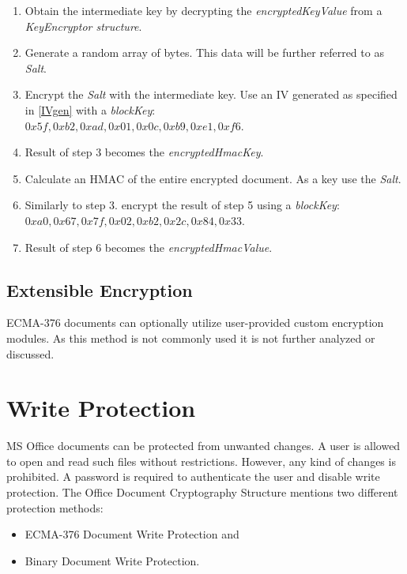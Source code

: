 \documentclass[11pt,oneside]{fithesis2}
\begin{document}
\begin{enumerate}
\setlength\itemsep{0.1em}
	\item{Obtain the intermediate key by decrypting the \textit{encryptedKeyValue} from a \textit{KeyEncryptor structure}.}
	\item{Generate a random array of bytes. This data will be further referred to as \textit{Salt}.}
	\item{Encrypt the \textit{Salt} with the intermediate key. Use an IV generated as specified in \ref{IVgen} with a \textit{blockKey}: \\ $0x5f, 0xb2, 0xad, 0x01, 0x0c, 0xb9, 0xe1, 0xf6$.}
	\item{Result of step 3 becomes the \textit{encryptedHmacKey}.}
	\item{Calculate an HMAC of the entire encrypted document. As a key use the \textit{Salt}.}
	\item{Similarly to step 3. encrypt the result of step 5 using a \textit{blockKey}: $0xa0, 0x67, 0x7f, 0x02, 0xb2, 0x2c, 0x84, 0x33$.}
	\item{Result of step 6 becomes the \textit{encryptedHmacValue}.}
\end{enumerate}

\subsection{Extensible Encryption} 

ECMA-376 documents can optionally utilize user-provided custom encryption modules. As this method is not commonly used it is not further analyzed or discussed.  

\section{Write Protection}

MS Office documents can be protected from unwanted changes. A user is allowed to open and read such files without restrictions. However, any kind of changes is prohibited. A password is required to authenticate the user and disable write protection. The Office Document Cryptography Structure mentions two different protection methods:

\begin{itemize}
\setlength\itemsep{0.1em}
	\item{ECMA-376 Document Write Protection and}
	\item{Binary Document Write Protection.}
\end{itemize}
\end{document}

